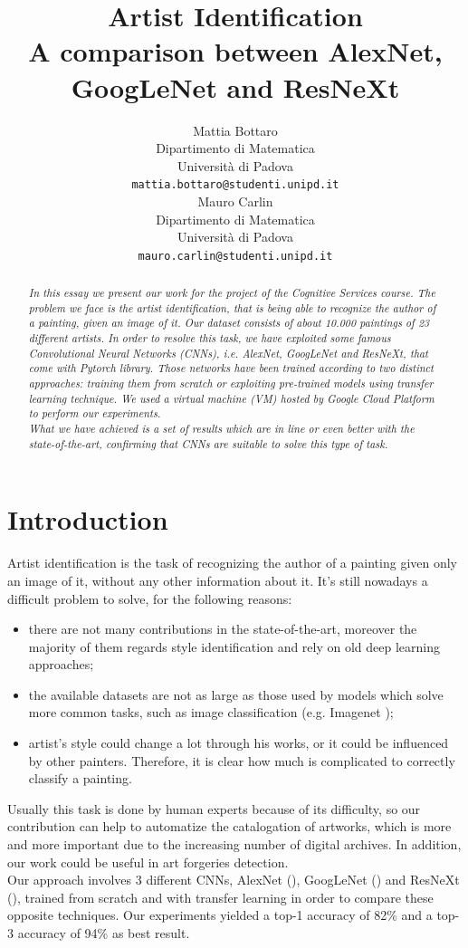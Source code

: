 \documentclass{article}
\title{Artist Identification	\\  A comparison between AlexNet, GoogLeNet and ResNeXt}
\author{
  Mattia Bottaro \\
  Dipartimento  di Matematica\\
  Università di Padova \\
  \texttt{mattia.bottaro@studenti.unipd.it} \\
   \And
  Mauro Carlin \\
Dipartimento  di Matematica\\
Università di Padova \\
\texttt{mauro.carlin@studenti.unipd.it} \\
}
\begin{document}
\maketitle

\begin{abstract}
	\textit{In this essay we present our work for the project of the Cognitive Services course.
	The problem we face is the artist identification, that is being able to recognize the author of a painting, given an image of it. Our dataset consists of about 10.000 paintings of 23 different artists.
	In order to resolve this task, we have exploited some famous Convolutional Neural Networks (CNNs), i.e. AlexNet, GoogLeNet and ResNeXt, that come with \textit{Pytorch} library. Those networks have been trained according to two distinct approaches: training them from scratch or exploiting pre-trained models using transfer learning technique. We used a virtual machine (VM) hosted by \textit{Google Cloud Platform} to perform our experiments.\\
	What we have achieved is a set of results which are in line or even better with the state-of-the-art, confirming that CNNs are suitable to solve this type of task.}
\end{abstract}




\section{Introduction}
Artist identification is the task of recognizing the author of a painting given only an image of it, without any other information about it. It's still nowadays a difficult problem to solve, for the following reasons:
\begin{itemize}
	\item there are not many contributions in the state-of-the-art, moreover the majority of them regards style identification and rely on old deep learning approaches;
	\item the available datasets are not as large as those used by models which solve more common tasks, such as image classification (e.g. Imagenet \cite{imagenet});
	\item artist's style could change a lot through his works, or it could be influenced by other painters. Therefore, it is clear how much is complicated to correctly classify a painting. 
\end{itemize}
Usually this task is done by human experts because of its difficulty, so our contribution can help to automatize the catalogation of artworks, which is more and more important due to the increasing number of  digital archives. In addition, our work could be useful in art forgeries detection.\\
Our approach involves 3 different CNNs, AlexNet (\cite{alexnet}), GoogLeNet (\cite{googlenet}) and ResNeXt (\cite{resneXt}), trained from scratch and with transfer learning in order to compare these opposite techniques. Our experiments yielded a top-1 accuracy of 82\%  and a top-3 accuracy of 94\% as best result.\\
\end{document}

